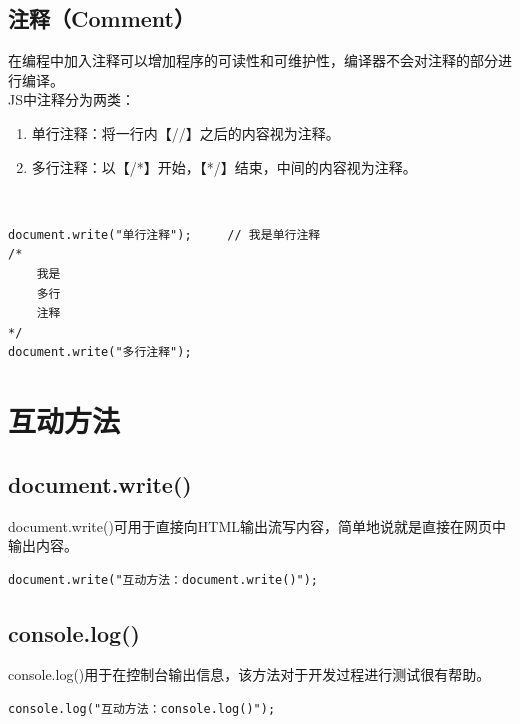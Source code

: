 \subsection{注释（Comment）}

在编程中加入注释可以增加程序的可读性和可维护性，编译器不会对注释的部分进行编译。\\

JS中注释分为两类：

\begin{enumerate}
	\item 单行注释：将一行内【//】之后的内容视为注释。
	\item 多行注释：以【/*】开始，【*/】结束，中间的内容视为注释。
\end{enumerate}

\\

\begin{lstlisting}[style=htmlcssjs]
document.write("单行注释");     // 我是单行注释
/*
    我是
    多行
    注释
*/
document.write("多行注释");
\end{lstlisting}

\newpage

\section{互动方法}

\subsection{document.write()}

document.write()可用于直接向HTML输出流写内容，简单地说就是直接在网页中输出内容。\\

\begin{lstlisting}[style=htmlcssjs]
document.write("互动方法：document.write()");
\end{lstlisting}

\vspace{0.5cm}

\subsection{console.log()}

console.log()用于在控制台输出信息，该方法对于开发过程进行测试很有帮助。\\

\begin{lstlisting}[style=htmlcssjs]
console.log("互动方法：console.log()");
\end{lstlisting}

